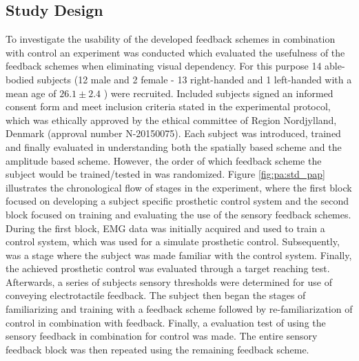 \subsection{Study Design}

To investigate the usability of the developed feedback schemes in combination with control an experiment was conducted which evaluated the usefulness of the feedback schemes when eliminating visual dependency. For this purpose 14 able-bodied subjects (12 male and 2 female - 13 right-handed and 1 left-handed with a mean age of $26.1 \pm 2.4$ ) were recruited. Included subjects signed an informed consent form and meet inclusion criteria stated in the experimental protocol, which was ethically approved by the ethical committee of Region Nordjylland, Denmark (approval number N-20150075). Each subject was introduced, trained and finally evaluated in understanding both the spatially based scheme and the amplitude based scheme. However, the order of which feedback scheme the subject would be trained/tested in was randomized. Figure \ref{fig:pa:std_pap} illustrates the chronological flow of stages in the experiment, where the first block focused on developing a subject specific prosthetic control system and the second block focused on training and evaluating the use of the sensory feedback schemes. 
During the first block, EMG data was initially acquired and used to train a control system, which was used for a simulate prosthetic control. Subsequently, was a stage where the subject was made familiar with the control system. Finally, the achieved prosthetic control was evaluated through a target reaching test. Afterwards, a series of subjects sensory thresholds were determined for use of conveying electrotactile feedback. The subject then began the stages of familiarizing and training with a feedback scheme followed by re-familiarization of control in combination with feedback. Finally, a evaluation test of using the sensory feedback in combination for control was made. The entire sensory feedback block was then repeated using the remaining feedback scheme. 

